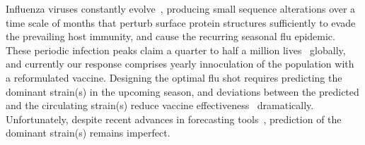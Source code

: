 \documentclass[onecolumn, compsoc,10pt]{IEEEtran}
\begin{document}
Influenza viruses constantly evolve~\cite{dos2016influenza},  producing small sequence alterations over a time scale of months  that  perturb surface protein structures sufficiently to evade the prevailing host immunity, and cause the  recurring seasonal flu epidemic. These periodic  infection peaks claim a quarter to half a million lives~\cite{huddleston2020integrating} globally,  and currently our response comprises  yearly innoculation of the  population with a  reformulated  vaccine.  Designing the optimal flu shot requires predicting the dominant  strain(s)  in the upcoming season, and deviations between the predicted and the circulating strain(s)  reduce  vaccine effectiveness~\cite{tricco2013comparing} dramatically. Unfortunately,  despite  recent advances in forecasting tools~\cite{neher2014predicting,huddleston2020integrating}, prediction of the dominant strain(s) remains imperfect. 
\end{document}
